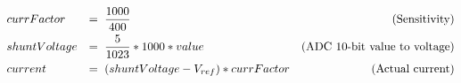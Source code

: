\begin{align}
  & currFactor      &= &\hspace{2mm} \frac{1000}{400}                 &\text{(Sensitivity)} \notag \\
  & shuntVoltage    &= &\hspace{2mm} \frac{5}{1023}*1000*value       &\text{(ADC 10-bit value to voltage)} \notag \\
  & current         &= &\hspace{2mm} (shuntVoltage-V_{ref})*currFactor   &\text{(Actual current)} \notag \\
  \notag
\end{align}
